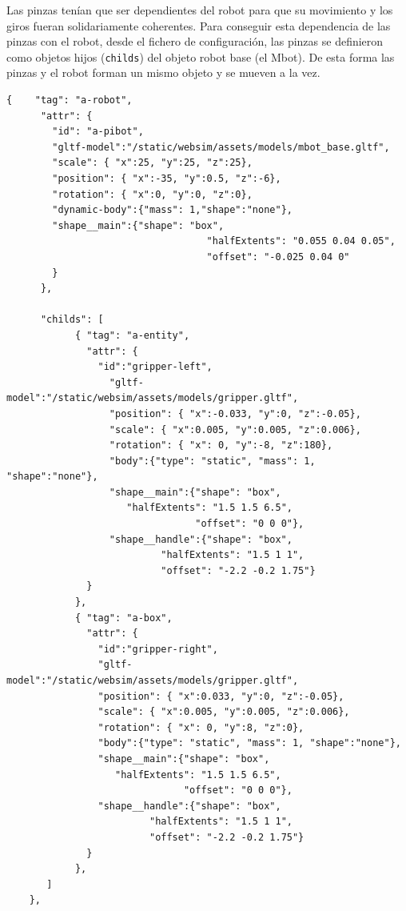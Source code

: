 Las pinzas tenían que ser dependientes del robot para que su movimiento y los giros fueran solidariamente coherentes. 
Para conseguir esta dependencia de las pinzas con el robot, desde el fichero de configuración, las pinzas se definieron como objetos hijos (\texttt{childs}) del objeto robot base (el Mbot). De esta forma las pinzas y el robot forman un mismo objeto y se mueven a la vez.

\begin{lstlisting}
{    "tag": "a-robot",
      "attr": {
        "id": "a-pibot",
        "gltf-model":"/static/websim/assets/models/mbot_base.gltf",
        "scale": { "x":25, "y":25, "z":25},
        "position": { "x":-35, "y":0.5, "z":-6},
        "rotation": { "x":0, "y":0, "z":0},
        "dynamic-body":{"mass": 1,"shape":"none"},
        "shape__main":{"shape": "box",
                                   "halfExtents": "0.055 0.04 0.05",
                                   "offset": "-0.025 0.04 0"
        }
      },
      
      "childs": [
            { "tag": "a-entity",
              "attr": {
                "id":"gripper-left",
		          "gltf-model":"/static/websim/assets/models/gripper.gltf",
                  "position": { "x":-0.033, "y":0, "z":-0.05},
                  "scale": { "x":0.005, "y":0.005, "z":0.006},
                  "rotation": { "x": 0, "y":-8, "z":180},
                  "body":{"type": "static", "mass": 1, "shape":"none"},
                  "shape__main":{"shape": "box",
                     "halfExtents": "1.5 1.5 6.5",
                                 "offset": "0 0 0"},
                  "shape__handle":{"shape": "box",
                           "halfExtents": "1.5 1 1",
                           "offset": "-2.2 -0.2 1.75"}
              }
            },
            { "tag": "a-box",
              "attr": {
                "id":"gripper-right",
		        "gltf-model":"/static/websim/assets/models/gripper.gltf",
                "position": { "x":0.033, "y":0, "z":-0.05},
                "scale": { "x":0.005, "y":0.005, "z":0.006},
                "rotation": { "x": 0, "y":8, "z":0},
                "body":{"type": "static", "mass": 1, "shape":"none"},
                "shape__main":{"shape": "box",
			       "halfExtents": "1.5 1.5 6.5",
                               "offset": "0 0 0"},
		        "shape__handle":{"shape": "box",
                         "halfExtents": "1.5 1 1",
                         "offset": "-2.2 -0.2 1.75"}
              }              
            },
       ]
    },
\end{lstlisting}

